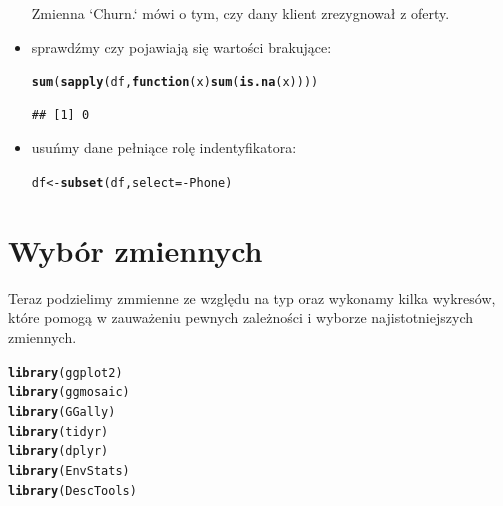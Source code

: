 \documentclass{article}\usepackage[]{graphicx}\usepackage[]{color}
\makeatletter
\newcommand{\hlopt}[1]{\textcolor[rgb]{0,0,0}{#1}}%
\newcommand{\hlstd}[1]{\textcolor[rgb]{0.345,0.345,0.345}{#1}}%
\newcommand{\hlkwa}[1]{\textcolor[rgb]{0.161,0.373,0.58}{\textbf{#1}}}%
\newcommand{\hlkwb}[1]{\textcolor[rgb]{0.69,0.353,0.396}{#1}}%
\newcommand{\hlkwc}[1]{\textcolor[rgb]{0.333,0.667,0.333}{#1}}%
\newcommand{\hlkwd}[1]{\textcolor[rgb]{0.737,0.353,0.396}{\textbf{#1}}}%
\newenvironment{kframe}{%
 \def\at@end@of@kframe{}%
 \ifinner\ifhmode%
  \def\at@end@of@kframe{\end{minipage}}%
  \begin{minipage}{\columnwidth}%
 \fi\fi%
 \def\FrameCommand##1{\hskip\@totalleftmargin \hskip-\fboxsep
 \colorbox{shadecolor}{##1}\hskip-\fboxsep
     \hskip-\linewidth \hskip-\@totalleftmargin \hskip\columnwidth}%
 \MakeFramed {\advance\hsize-\width
   \@totalleftmargin\z@ \linewidth\hsize
   \@setminipage}}%
 {\par\unskip\endMakeFramed%
 \at@end@of@kframe}
\newenvironment{knitrout}{}{} %
\makeatother
\begin{document}
\begin{itemize}
Zmienna `Churn.` mówi o tym, czy dany klient zrezygnował z oferty.

\item sprawdźmy czy pojawiają się wartości brakujące:
\begin{knitrout}
\color{fgcolor}\begin{kframe}
\begin{alltt}
\hlkwd{sum}\hlstd{(}\hlkwd{sapply}\hlstd{(df,} \hlkwa{function}\hlstd{(}\hlkwc{x}\hlstd{)} \hlkwd{sum}\hlstd{(}\hlkwd{is.na}\hlstd{(x))))}
\end{alltt}
\begin{verbatim}
## [1] 0
\end{verbatim}
\end{kframe}
\end{knitrout}

\item usuńmy dane pełniące rolę indentyfikatora:
\begin{knitrout}
\color{fgcolor}\begin{kframe}
\begin{alltt}
\hlstd{df} \hlkwb{<-} \hlkwd{subset}\hlstd{(df,} \hlkwc{select}\hlstd{=}\hlopt{-}\hlstd{Phone)}
\end{alltt}
\end{kframe}
\end{knitrout}

\end{itemize}

\section{Wybór zmiennych}
Teraz podzielimy zmmienne ze względu na typ oraz wykonamy kilka wykresów, które pomogą w zauważeniu pewnych zależności i wyborze najistotniejszych zmiennych.
\begin{knitrout}
\color{fgcolor}\begin{kframe}
\begin{alltt}
\hlkwd{library}\hlstd{(ggplot2)}
\hlkwd{library}\hlstd{(ggmosaic)}
\hlkwd{library}\hlstd{(GGally)}
\hlkwd{library}\hlstd{(tidyr)}
\hlkwd{library}\hlstd{(dplyr)}
\hlkwd{library}\hlstd{(EnvStats)}
\hlkwd{library}\hlstd{(DescTools)}
\end{alltt}
\end{kframe}
\end{knitrout}
\end{document}
